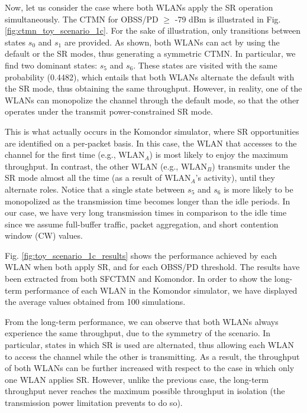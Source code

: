 \documentclass[comsoc]{IEEEtran}
\begin{document}
	Now, let us consider the case where both WLANs apply the SR operation simultaneously. The CTMN for OBSS/PD $\geq$ -79 dBm is illustrated in Fig. \ref{fig:ctmn_toy_scenario_1c}. For the sake of illustration, only transitions between states $s_0$ and $s_1$ are provided. As shown, both WLANs can act by using the default or the SR modes, thus generating a symmetric CTMN. In particular, we find two dominant states: $s_5$  and $s_6$. These states are visited with the same probability (0.4482), which entails that both WLANs alternate the default with the SR mode, thus obtaining the same throughput. However, in reality, one of the WLANs can monopolize the channel through the default mode, so that the other operates under the transmit power-constrained SR mode.
	
	This is what actually occurs in the Komondor simulator, where SR opportunities are identified on a per-packet basis. In this case, the WLAN that accesses to the channel for the first time (e.g., $\text{WLAN}_A$) is most likely to enjoy the maximum throughput. In contrast, the other WLAN (e.g., $\text{WLAN}_B$) transmits under the SR mode almost all the time (as a result of $\text{WLAN}_A$'s activity), until they alternate roles. Notice that a single state between $s_5$  and $s_6$ is more likely to be monopolized as the transmission time becomes longer than the idle periods. In our case, we have very long transmission times in comparison to the idle time since we assume full-buffer traffic, packet aggregation, and short contention window (CW) values.
	
	Fig. \ref{fig:toy_scenario_1c_results} shows the performance achieved by each WLAN when both apply SR, and for each OBSS/PD threshold. The results have been extracted from both SFCTMN and Komondor. In order to show the long-term performance of each WLAN in the Komondor simulator, we have displayed the average values obtained from 100 simulations.
	
	From the long-term performance, we can observe that both WLANs always experience the same throughput, due to the symmetry of the scenario. In particular, states in which SR is used are alternated, thus allowing each WLAN to access the channel while the other is transmitting. As a result, the throughput of both WLANs can be further increased with respect to the case in which only one WLAN applies SR. However, unlike the previous case, the long-term throughput never reaches the maximum possible throughput in isolation (the transmission power limitation prevents to do so).
	
\end{document}
